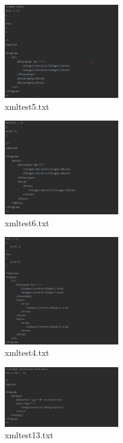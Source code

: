 \documentclass{article}
\begin{document}
\begin{multicols}{2}
					

					\begin{figure}[H]
					\centering
			 			\includegraphics[width=0.45\textwidth]{xmltest5.png}
			 			\centering
			  			\caption{xmltest5.txt}
			  			\label{fig:xmltest5}
					\end{figure}
					\begin{figure}[H]
					\centering
			 			\includegraphics[width=0.45\textwidth]{xmltest6.png}
			 			\centering
			  			\caption{xmltest6.txt}
			  			\label{fig:xmltest6}
					\end{figure}
					
										
					\begin{figure}[H]
					\centering
			 			\includegraphics[width=0.45\textwidth]{xmltest4.png}
			 			\centering
			  			\caption{xmltest4.txt}
			  			\label{fig:xmltest4}
					\end{figure}
					
					
					\begin{figure}[H]
					\centering
			 			\includegraphics[width=0.45\textwidth]{xmltest13.png}
			 			\centering
			  			\caption{xmltest13.txt}
			  			\label{fig:xmltest13}
					\end{figure}
					

\end{multicols}
\end{document}
